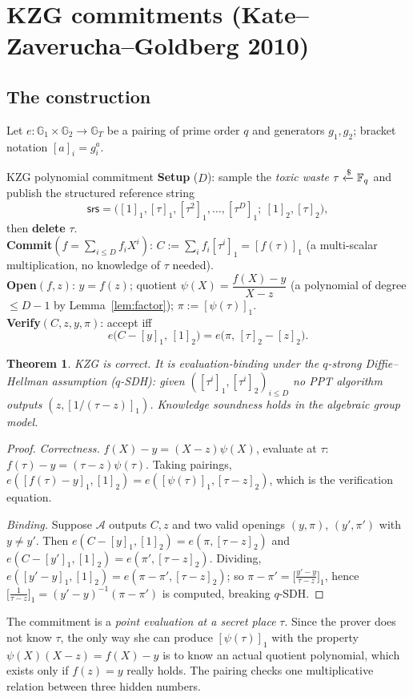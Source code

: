 \documentclass[11pt,a4paper]{report}
\theoremstyle{plain}
\newtheorem{theorem}{Theorem}[chapter]
\theoremstyle{definition}
\theoremstyle{remark}
\newcommand{\GG}{\mathbb{G}}
\newcommand{\getsr}{\xleftarrow{\$}}
\begin{document}
\section{KZG commitments (Kate--Zaverucha--Goldberg 2010)}
\subsection{The construction}
Let $e:\GG_1\times\GG_2\to\GG_T$ be a pairing of prime order $q$ and generators $g_1,g_2$; bracket notation $[a]_i=g_i^a$.
\begin{algorithm}[label=pr:kzg]{KZG polynomial commitment}
\textbf{Setup} ($D$): sample the \emph{toxic waste} $\tau\getsr\FF_q$ and publish the structured reference string
\[\mathsf{srs}=\big([1]_1,[\tau]_1,[\tau^2]_1,\dots,[\tau^D]_1;\ [1]_2,[\tau]_2\big),\]
then \textbf{delete} $\tau$.\\
\textbf{Commit}$(f=\sum_{i\le D}f_iX^i)$: $C:=\sum_if_i[\tau^i]_1=[f(\tau)]_1$ (a multi-scalar multiplication, no knowledge of $\tau$ needed).\\
\textbf{Open}$(f,z)$: $y=f(z)$; quotient $\psi(X)=\dfrac{f(X)-y}{X-z}$ (a polynomial of degree $\le D-1$ by Lemma~\ref{lem:factor}); $\pi:=[\psi(\tau)]_1$.\\
\textbf{Verify}$(C,z,y,\pi)$: accept iff
\[e\big(C-[y]_1,\,[1]_2\big)=e\big(\pi,\,[\tau]_2-[z]_2\big).\]
\end{algorithm}
\begin{theorem}\label{thm:kzg}
KZG is correct. It is evaluation-binding under the $q$-strong Diffie--Hellman assumption ($q$-SDH): given $([\tau^i]_1,[\tau^i]_2)_{i\le D}$ no PPT algorithm outputs $(z,[1/(\tau-z)]_1)$. Knowledge soundness holds in the algebraic group model.
\end{theorem}
\begin{proof}
\emph{Correctness.} $f(X)-y=(X-z)\psi(X)$, evaluate at $\tau$: $f(\tau)-y=(\tau-z)\psi(\tau)$. Taking pairings, $e([f(\tau)-y]_1,[1]_2)=e([\psi(\tau)]_1,[\tau-z]_2)$, which is the verification equation.

\emph{Binding.} Suppose $\mathcal A$ outputs $C,z$ and two valid openings $(y,\pi)$, $(y',\pi')$ with $y\ne y'$. Then
$e(C-[y]_1,[1]_2)=e(\pi,[\tau-z]_2)$ and $e(C-[y']_1,[1]_2)=e(\pi',[\tau-z]_2)$. Dividing, $e([y'-y]_1,[1]_2)=e(\pi-\pi',[\tau-z]_2)$; so $\pi-\pi'=\big[\tfrac{y'-y}{\tau-z}\big]_1$, hence $\Big[\tfrac1{\tau-z}\Big]_1=(y'-y)^{-1}(\pi-\pi')$ is computed, breaking $q$-SDH.
\end{proof}
\begin{intuition}
The commitment is a \emph{point evaluation at a secret place} $\tau$. Since the prover does not know $\tau$, the only way she can produce $[\psi(\tau)]_1$ with the property $\psi(X)(X-z)=f(X)-y$ is to know an actual quotient polynomial, which exists only if $f(z)=y$ really holds. The pairing checks one multiplicative relation between three hidden numbers.
\end{intuition}
\end{document}
